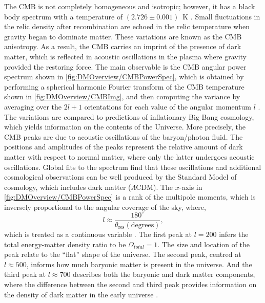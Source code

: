 The CMB is not completely homogeneous and isotropic; however, it has a black body spectrum with a temperature of $(2.726\pm0.001)$~K \cite{Fixsen_2009}. Small fluctuations in the relic density after recombination are echoed in the relic temperature when gravity began to dominate matter. These variations are known as the CMB anisotropy. As a result, the CMB carries an imprint of the presence of dark matter, which is reflected in acoustic oscillations in the plasma where gravity provided the restoring force. The main observable is the CMB angular power spectrum shown in \autoref{fig:DMOverview/CMBPowerSpec}, which is obtained by performing a spherical harmonic Fourier transform of the CMB temperature shown in \autoref{fig:DMOverview/CMBImg}, and then computing the variance by averaging over the $2l+1$ orientations for each value of the angular momentum $l$ \cite{Cirelli:2024ssz}. The variations are compared to predictions of inflationary Big Bang cosmology, which yields information on the contents of the Universe. More precisely, the CMB peaks are due to acoustic oscillations of the baryon/photon fluid. The positions and amplitudes of the peaks represent the relative amount of dark matter with respect to normal matter, where only the latter undergoes acoustic oscillations. Global fits to the spectrum find that these oscillations and additional cosmological observations can be well produced by the Standard Model of cosmology, which includes dark matter ($\Lambda \text{CDM}$). The $x$-axis in \autoref{fig:DMOverview/CMBPowerSpec} is a rank of the multipole moments, which is inversely proportional to the angular coverage of the sky, where,
\begin{equation}
    l \approx\frac{180^{\circ}}{\theta_{\text{res}}(\text{degrees})},
\end{equation}
which is treated as a continuous variable \cite{Young2016}. The first peak at $l=200$ infers the total energy-matter density ratio to be $\Omega_{total}=1$. The size and location of the peak relate to the ``flat'' shape of the universe. The second peak, centred at $l\approx500$, informs how much baryonic matter is present in the universe. And the third peak at $l\approx700$ describes both the baryonic and dark matter components, where the difference between the second and third peak provides information on the density of dark matter in the early universe \cite{Young2016}.

